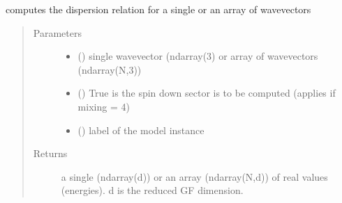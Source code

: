\documentclass[letterpaper,10pt,english]{sphinxmanual}
\begin{document}

\begin{fulllineitems}
\label{\detokenize{functions:pyqcm.dispersion}}
\sphinxAtStartPar
computes the dispersion relation for a single or an array of wavevectors
\begin{quote}\begin{description}
\item[{Parameters}] \leavevmode\begin{itemize}
\item {} 
\sphinxAtStartPar
{} () \textendash{} single wavevector (ndarray(3) or array of wavevectors (ndarray(N,3))

\item {} 
\sphinxAtStartPar
{} () \textendash{} True is the spin down sector is to be computed (applies if mixing = 4)

\item {} 
\sphinxAtStartPar
{} () \textendash{} label of the model instance

\end{itemize}

\item[{Returns}] \leavevmode
\sphinxAtStartPar
a single (ndarray(d)) or an array (ndarray(N,d)) of real values (energies). d is the reduced GF dimension.

\end{description}\end{quote}

\end{fulllineitems}

\end{document}
